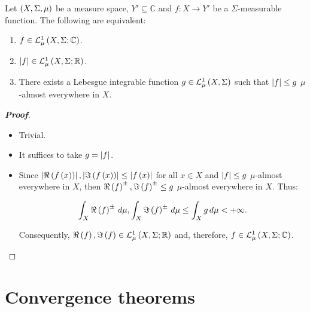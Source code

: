 \begin{theorem}
  Let $\left(X,\Sigma,\mu\right)$ be a measure space, $Y'\subseteq\mathbb{C}$ and $f:X\rightarrow Y'$ be a $\Sigma$-measurable function. The following are equivalent:

  \begin{enumerate}
    \item $f\in\mathcal{L}^1_{\mu}\left(X,\Sigma;\mathbb{C}\right)$.
    \item $\left|f\right|\in\mathcal{L}^1_{\mu}\left(X,\Sigma;\mathbb{R}\right)$.
    \item There exists a Lebesgue integrable function $g\in\mathcal{L}^1_{\mu}\left(X,\Sigma\right)$ such that $\left|f\right|\leq g$ $\mu$-almost everywhere in $X$.
  \end{enumerate}
  \begin{proof}[\rm\textbf{Proof}]
    \hfill
    \begin{itemize}
      \item[\boxed{1\Rightarrow2}] Trivial.
      \item[\boxed{2\Rightarrow3}] It suffices to take $g=\left|f\right|$.
      \item[\boxed{3\Rightarrow1}] Since $\left|\Re\left(f\left(x\right)\right)\right|,\left|\Im\left(f\left(x\right)\right)\right|\leq\left|f\left(x\right)\right|$ for all $x\in X$ and $\left|f\right|\leq g$ $\mu$-almost everywhere in $X$, then $\Re\left(f\right)^\pm,\Im\left(f\right)^\pm\leq g$ $\mu$-almost everywhere in $X$. Thus:
      
      \begin{equation}
        \int_{X}{\Re\left(f\right)^\pm\,d\mu},\int_{X}{\Im\left(f\right)^\pm\,d\mu}\leq\int_{X}{g\,d\mu}<+\infty.
      \end{equation}

      Consequently, $\Re\left(f\right),\Im\left(f\right)\in\mathcal{L}^1_{\mu}\left(X,\Sigma;\mathbb{R}\right)$ and, therefore, $f\in\mathcal{L}^1_{\mu}\left(X,\Sigma;\mathbb{C}\right)$.
    \end{itemize}
  \end{proof}
\end{theorem}

\section{Convergence theorems}

